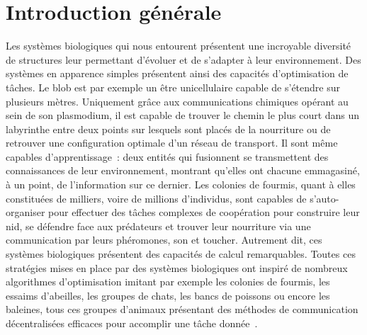 \chapter*{Introduction générale}

Les systèmes biologiques qui nous entourent présentent une incroyable diversité de structures leur permettant d'évoluer et de s'adapter à leur environnement.
Des systèmes en apparence simples présentent ainsi des capacités d'optimisation de tâches. Le blob est par exemple un être unicellulaire capable de s'étendre sur plusieurs mètres. Uniquement grâce aux communications chimiques opérant au sein de son plasmodium, il est capable de trouver le chemin le plus court dans un labyrinthe entre deux points sur lesquels sont placés de la nourriture \cite{Nakagaki2000IntelligenceMB} ou de retrouver une configuration optimale d'un réseau de transport. Il sont même capables d'apprentissage~: deux entités qui fusionnent se transmettent des connaissances de leur environnement, montrant qu'elles ont chacune emmagasiné, à un point, de l'information sur ce dernier.
Les colonies de fourmis, quant à elles constituées de milliers, voire de millions d'individus, sont capables de s'auto-organiser pour effectuer des tâches complexes de coopération pour construire leur nid, se défendre face aux prédateurs et trouver leur nourriture via une communication par leurs phéromones, son et toucher.
Autrement dit, ces systèmes biologiques présentent des capacités de calcul remarquables. 
Toutes ces stratégies mises en place par des systèmes biologiques ont inspiré de nombreux algorithmes d'optimisation imitant par exemple les colonies de fourmis, les essaims d'abeilles, les groupes de chats, les bancs de poissons ou encore les baleines, tous ces groupes d'animaux présentant des méthodes de communication décentralisées efficaces pour accomplir une tâche donnée~\cite{Darwish2018BioinspiredCA}.

